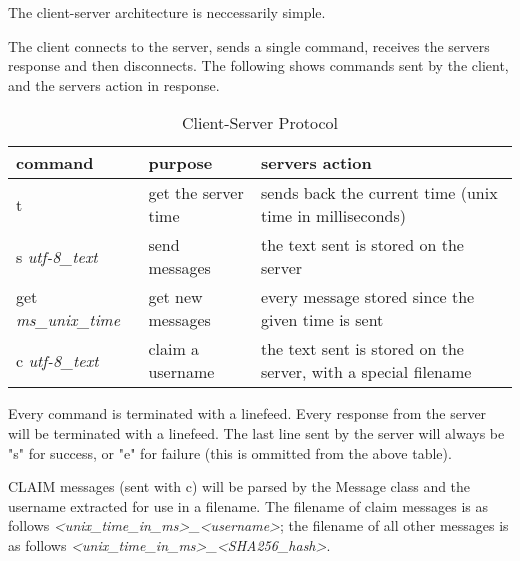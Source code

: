 The client-server architecture is neccessarily simple.

The client connects to the server, sends a single command, receives the servers
response and then disconnects. The following shows commands sent by the client,
and the servers action in response.

\begin{table}[h]
    \centering
    \begin{tabular}{lll}
    command                     & purpose             & servers action\\ \hline
    t                           & get the server time & sends back the current time (unix time in milliseconds)\\
    s   \textit{utf-8\_text}    & send messages       & the text sent is stored on the server\\
    get \textit{ms\_unix\_time} & get new messages    & every message stored since the given time is sent\\
    c   \textit{utf-8\_text}    & claim a username    & the text sent is stored on the server, with a special filename\\
    \end{tabular}
    \caption{Client-Server Protocol}
\end{table}

Every command is terminated with a linefeed. Every response from the server will
be terminated with a linefeed. The last line sent by the server will always be
"s" for success, or "e" for failure (this is ommitted from the above table).

CLAIM messages (sent with c) will be parsed by the Message class and the
username extracted for use in a filename. The filename of claim messages is as
follows
\textit{\textless unix\_time\_in\_ms\textgreater \_\textless username\textgreater};
the filename of all other messages is as follows
\textit{\textless unix\_time\_in\_ms\textgreater \_\textless SHA256\_hash\textgreater}.
